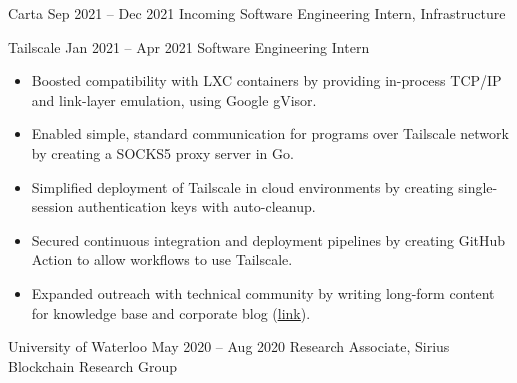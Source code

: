 \documentclass{article}
\begin{document}
\normalsize
\WorkEntry
{Carta}
{Sep 2021 -- Dec 2021}
{Incoming Software Engineering Intern, Infrastructure}
{
}
\iffalse
Made Tailscale ready for the cloud, by creating features that allowed it to run in lightweight, unprivileged container environments. This included a virtual networking stack for connecting to the Tailscale network without kernel privileges to create a network driver, a SOCKS5 proxy to allow applications to communicate over this virtual networking stack, and ephemeral authentication keys for stateless access to the Tailscale network. Also published long-form technical content on company blog (https://tailscale.com/blog/2021-05-github-actions-and-tailscale/) and contributed to product knowledge base.
\fi
\WorkEntry
{Tailscale}
{Jan 2021 -- Apr 2021}
{Software Engineering Intern}
{\begin{itemize} \itemsep -1pt
    \item Boosted compatibility with LXC containers by providing in-process TCP/IP and link-layer emulation, using Google gVisor.
    \item Enabled simple, standard communication for programs over Tailscale network by creating a SOCKS5 proxy server in Go.
    \item Simplified deployment of Tailscale in cloud environments by creating single-session authentication keys with auto-cleanup.
    \item Secured continuous integration and deployment pipelines by creating GitHub Action to allow workflows to use Tailscale.
    \item Expanded outreach with technical community by writing long-form content for knowledge base and corporate blog (\underline{\href{https://tailscale.com/blog/2021-05-github-actions-and-tailscale/}{link}}).
    \end{itemize}}
\vspace{1mm}
\iffalse
Accelerated research in the field of Byzantine fault tolerant distributed computing, by implementing security features (like BLS signature verification), streamlining build and deployment of project using Docker, and reducing technical debt by standardizing use of external dependencies. Conducted performance benchmarks on AWS and analyzed performance data using gnuplot and Python.
\fi
\WorkEntry
{University of Waterloo}
{May 2020 -- Aug 2020}
{Research Associate, Sirius Blockchain Research Group}
\end{document}
